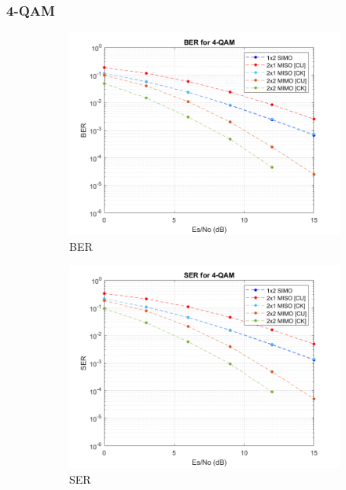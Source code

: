 \documentclass{article}
\begin{document}
\subsubsection{4-QAM}
\begin{figure}[H]
	\centering
	\begin{subfigure}{0.5\textwidth}
		\centerline{\includegraphics[width=1\textwidth]{4qamber.png}}
		\caption{BER}
	\end{subfigure}%
	\begin{subfigure}{0.5\textwidth}
		\centerline{\includegraphics[width=1\textwidth]{4qamser.png}}
		\caption{SER}
	\end{subfigure}\\%
	\begin{subfigure}{0.5\textwidth}

\end{subfigure}
\end{figure}
\end{document}
